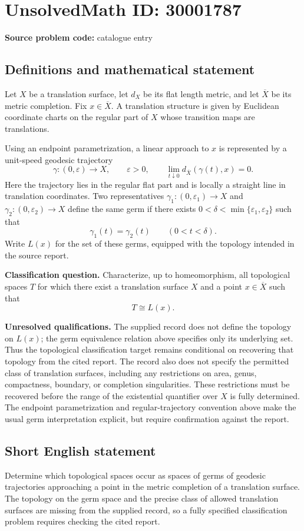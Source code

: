\documentclass[11pt]{article}
\begin{document}
\section*{UnsolvedMath ID: 30001787}
\textbf{Source problem code:} catalogue entry
\subsection{Definitions and mathematical statement}
Let \(X\) be a translation surface, let \(d_X\) be its flat length metric, and let \(\overline X\) be its metric completion. Fix \(x\in\overline X\). A translation structure is given by Euclidean coordinate charts on the regular part of \(X\) whose transition maps are translations.

Using an endpoint parametrization, a linear approach to \(x\) is represented by a unit-speed geodesic trajectory
\[
\gamma:(0,\varepsilon)\longrightarrow X,\qquad \varepsilon>0,\qquad
\lim_{t\downarrow0}d_{\overline X}(\gamma(t),x)=0.
\]
Here the trajectory lies in the regular flat part and is locally a straight line in translation coordinates. Two representatives \(\gamma_1:(0,\varepsilon_1)\to X\) and \(\gamma_2:(0,\varepsilon_2)\to X\) define the same germ if there exists \(0<\delta<\min\{\varepsilon_1,\varepsilon_2\}\) such that
\[
\gamma_1(t)=\gamma_2(t)\qquad(0<t<\delta).
\]
Write \(L(x)\) for the set of these germs, equipped with the topology intended in the source report.

\textbf{Classification question.} Characterize, up to homeomorphism, all topological spaces \(T\) for which there exist a translation surface \(X\) and a point \(x\in\overline X\) such that
\[
T\cong L(x).
\]

\textbf{Unresolved qualifications.} The supplied record does not define the topology on \(L(x)\); the germ equivalence relation above specifies only its underlying set. Thus the topological classification target remains conditional on recovering that topology from the cited report. The record also does not specify the permitted class of translation surfaces, including any restrictions on area, genus, compactness, boundary, or completion singularities. These restrictions must be recovered before the range of the existential quantifier over \(X\) is fully determined. The endpoint parametrization and regular-trajectory convention above make the usual germ interpretation explicit, but require confirmation against the report.
\subsection{Short English statement}
Determine which topological spaces occur as spaces of germs of geodesic trajectories approaching a point in the metric completion of a translation surface. The topology on the germ space and the precise class of allowed translation surfaces are missing from the supplied record, so a fully specified classification problem requires checking the cited report.
\end{document}

